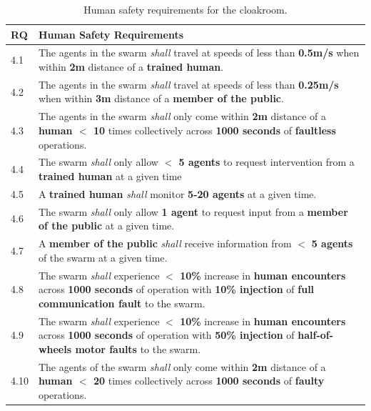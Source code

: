 \documentclass[runningheads]{llncs}
\begin{document}
\tiny
\begin{table}[!h]
\centering
\begin{tabular}{p{6mm} p{116mm}}
	RQ & \textbf{Human Safety Requirements} \\
	\hline
	4.1 & The agents in the swarm \emph{shall} travel at speeds of less than \textbf{0.5m/s} when within \textbf{2m} distance of a \textbf{trained human}.
	\\ 
	\hline
	4.2 & The agents in the swarm \emph{shall} travel at speeds of less than \textbf{0.25m/s} when within \textbf{3m} distance of a \textbf{member of the public}.
	\\ 
	\hline
	4.3 & The agents in the swarm \emph{shall} only come within \textbf{2m} distance of a \textbf{human $<$ 10} times collectively across \textbf{1000 seconds} of \textbf{faultless} operations.
	\\ 
	\hline
	4.4 & The swarm \emph{shall} only allow \textbf{$<$ 5 agents} to request intervention from a \textbf{trained human} at a given time
	\\ 
	\hline
	4.5 & A \textbf{trained human} \emph{shall} monitor \textbf{5-20 agents} at a given time.
	\\ 
	\hline
	4.6 & The swarm \emph{shall} only allow \textbf{1 agent} to request input from a \textbf{member of the public} at a given time.
	\\ 
	\hline
	4.7 & A \textbf{member of the public} \emph{shall} receive  information from $<$ \textbf{5 agents} of the swarm at a given time.
	\\ 
	\hline
	4.8 & The swarm \emph{shall} experience \textbf{$<$ 10\%} increase in \textbf{human encounters} across \textbf{1000 seconds} of operation with \textbf{10\% injection} of \textbf{full communication fault} to the swarm. \\
	\hline
	4.9 & The swarm \emph{shall} experience \textbf{$<$ 10\%} increase in \textbf{human encounters }across \textbf{1000 seconds} of operation with \textbf{50\% injection} of \textbf{half-of-wheels motor faults} to the swarm.\\
	\hline
	4.10 & The agents of the swarm \emph{shall} only come within \textbf{2m} distance of a \textbf{human $<$ 20} times collectively across \textbf{1000 seconds} of \textbf{faulty} operations.
	\\		[1ex] 		
	\hline
\end{tabular}
\caption{\label{tab:human-s}Human safety requirements for the cloakroom.}
\vspace{-4ex}
\end{table}   
\normalsize
\end{document}
